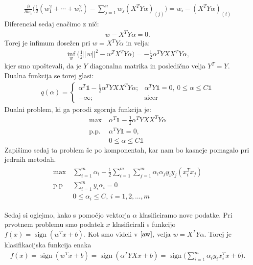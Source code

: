 \documentclass[mat1]{fmfdelo}
\DeclareMathOperator{\sign}{sign}
\begin{document}
\begin{align*}
\frac{\partial}{\partial w_i}\Big(\frac{1}{2}(w_1^2 + \cdots + w_n^2) - \sum_{j=1}^{n}w_j(X^TY\alpha)_{(j)}\Big) = w_i - (X^TY\alpha)_{(i)}
\end{align*}
Diferencial sedaj enačimo z nič: 
\begin{align}
\label{aw}w -X^TY\alpha = 0.
\end{align}
Torej je infimum dosežen pri  $w  =X^TY\alpha $ in velja: 
\begin{align*}
\inf_{w}\bigg(\frac{1}{2}||w||^2 - w^TX^TY\alpha\bigg) = -\frac{1}{2}\alpha^TYXX^TY\alpha,
\end{align*}
kjer smo upoštevali, da je $Y$ diagonalna matrika in posledično velja $Y^T = Y.$ Dualna funkcija se torej glasi: 
\begin{align*}
q(\alpha) = 
\begin{cases}
\alpha^T\mathds{1} - \frac{1}{2}\alpha^TYXX^TY\alpha; & \alpha^TY\mathds{1} = 0, ~0\le\alpha \le C\mathds{1} \\
-\infty; & \text{sicer}
\end{cases}
\end{align*}
Dualni problem, ki ga porodi zgornja funkcija je: 
\begin{align*}
\max ~ 	&\alpha^T\mathds{1} - \frac{1}{2}\alpha^TYXX^TY\alpha \\
\text{p.p.} ~ &\alpha^T Y\mathds{1} = 0, \\
&0 \le \alpha \le C\mathds{1} 
\end{align*}
Zapišimo sedaj ta problem še po komponentah, kar nam bo kasneje pomagalo pri jedrnih metodah. 
\begin{align}
\label{DPS}
\begin{split}
\max~ &\sum_{i = 1}^{m}\alpha_i - \frac{1}{2}\sum_{i = 1}^{m}\sum_{j=1}^{m}\alpha_i\alpha_jy_iy_j(x_i^Tx_j)\\
\text{p.p} ~ &\sum_{i=1}^{m}y_i\alpha_i = 0\\
&0\le \alpha_i \le C, ~ i=1, 2, \ldots,m
\end{split}
\end{align}

Sedaj si oglejmo, kako s pomočjo vektorja $\alpha$ klasificiramo nove podatke. Pri prvotnem problemu smo podatek $x$ klasificirali s funkcijo $f(x) = \sign{(w^Tx+ b)}.$ Kot smo videli v $\eqref{aw}$, velja $w = X^TY\alpha $. Torej je klasifikacijska funkcija enaka 
\begin{align*}
f(x) = \sign{(w^Tx+ b)} = \sign(\alpha^TYXx+b) = \sign\bigg(\sum_{i=1}^{m}\alpha_iy_ix_i^Tx + b\bigg).
\end{align*}
\end{document}
